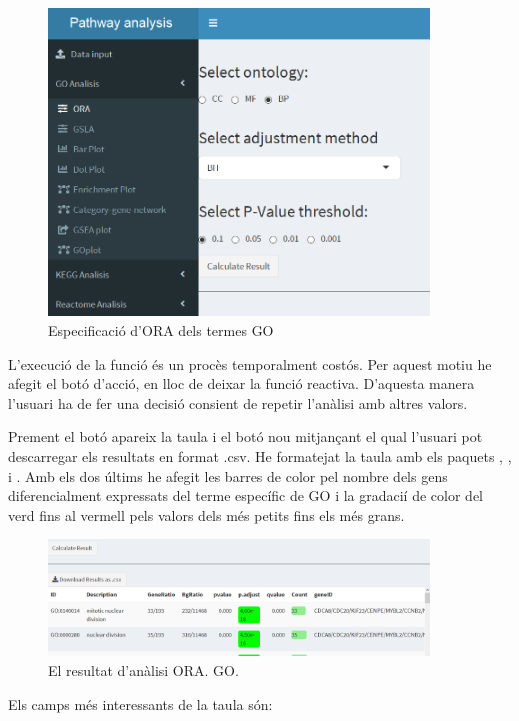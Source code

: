 \documentclass[]{article}
\begin{document}
\begin{figure}[h!]
\includegraphics[width=0.9\textwidth]{App_F5_Items_GO_ORA.png}
\caption{Especificació d'ORA dels termes GO}
\end{figure}
L'execució de la funció és un procès temporalment costós. Per aquest motiu he afegit el botó d'acció, en lloc de deixar la funció reactiva. D'aquesta manera l'usuari ha de fer una decisió consient de repetir l'anàlisi amb altres valors.

Prement el botó apareix la taula i el botó nou mitjançant el qual l'usuari pot descarregar els resultats en format .csv. He formatejat la taula amb els paquets , ,  i . Amb els dos últims he afegit les barres de color pel nombre dels gens diferencialment expressats del terme específic de GO i la gradacií de color del verd fins al vermell pels valors dels més petits fins els més grans. 

\begin{figure}[h!]
\centering
\includegraphics[width=0.9\textwidth]{App_F6_Items_GO_ORA_Table.png} 
\caption{El resultat d'anàlisi ORA. GO.}
\end{figure}

Els camps més interessants de la taula són:
\end{document}
